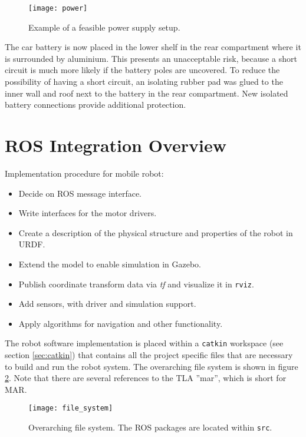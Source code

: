 \begin{figure}[h]
	\centering
	\texttt{[image: power]}
	\caption{Example of a feasible power supply setup.}
	\label{fig:power}
\end{figure}

The car battery is now placed in the lower shelf in the rear compartment where it is surrounded by aluminium. This presents an unacceptable risk, because a short circuit is much more likely if the battery poles are uncovered. To reduce the possibility of having a short circuit, an isolating rubber pad was glued to the inner wall and roof next to the battery in the rear compartment. New isolated battery connections provide additional protection. 

\section{ROS Integration Overview}
\label{sec:integration}
Implementation procedure for mobile robot:

\begin{itemize}

	\item Decide on ROS message interface.
	\item Write interfaces for the motor drivers.
	\item Create a description of the physical structure and properties of the robot in \ac{URDF}. 
	\item Extend the model to enable simulation in Gazebo.
	\item Publish coordinate transform data via \textit{tf} and visualize it in \texttt{rviz}.
	\item Add sensors, with driver and simulation support.
	\item Apply algorithms for navigation and other functionality. 

\end{itemize}

The robot software implementation is placed within a \texttt{catkin} workspace (see section \ref{sec:catkin}) that contains all the project specific files that are necessary to build and run the robot system. The overarching file system is shown in figure \ref{fig:file_system}. Note that there are several references to the \ac{TLA} ''mar'', which is short for \ac{MAR}.

\begin{figure}[h]
	\centering
	\texttt{[image: file\_system]}
	\caption{Overarching file system. The \ac{ROS} packages are located within \texttt{src}.}
	\label{fig:file_system}
\end{figure}

